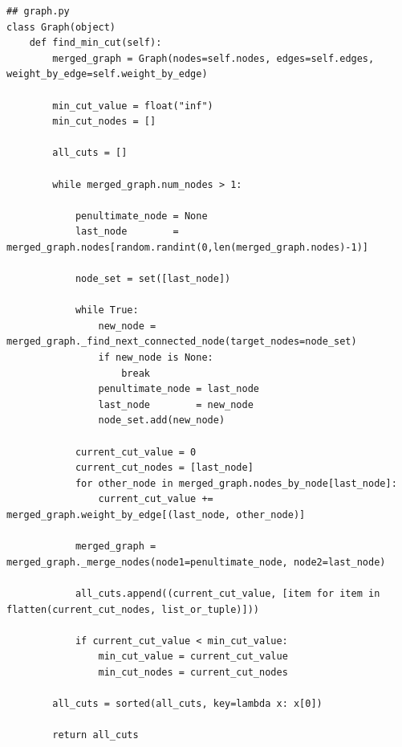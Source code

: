 \documentclass{article}
\begin{document}
\begin{lstlisting}
## graph.py
class Graph(object)
    def find_min_cut(self):
        merged_graph = Graph(nodes=self.nodes, edges=self.edges, weight_by_edge=self.weight_by_edge)

        min_cut_value = float("inf")
        min_cut_nodes = []

        all_cuts = []

        while merged_graph.num_nodes > 1:

            penultimate_node = None
            last_node        = merged_graph.nodes[random.randint(0,len(merged_graph.nodes)-1)]

            node_set = set([last_node])

            while True:
                new_node = merged_graph._find_next_connected_node(target_nodes=node_set)
                if new_node is None:
                    break
                penultimate_node = last_node
                last_node        = new_node
                node_set.add(new_node)

            current_cut_value = 0
            current_cut_nodes = [last_node]
            for other_node in merged_graph.nodes_by_node[last_node]:
                current_cut_value += merged_graph.weight_by_edge[(last_node, other_node)]

            merged_graph = merged_graph._merge_nodes(node1=penultimate_node, node2=last_node)

            all_cuts.append((current_cut_value, [item for item in flatten(current_cut_nodes, list_or_tuple)]))

            if current_cut_value < min_cut_value:
                min_cut_value = current_cut_value
                min_cut_nodes = current_cut_nodes

        all_cuts = sorted(all_cuts, key=lambda x: x[0])

        return all_cuts
\end{lstlisting}
\end{document}
